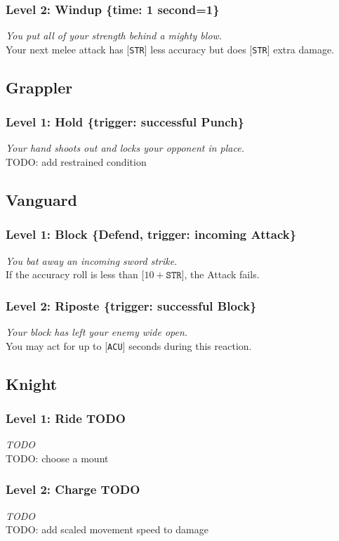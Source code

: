 \documentclass[12pt]{article}
\newcommand{\STR}{\texttt{STR}}
\newcommand{\ACU}{\texttt{ACU}}
\newcommand{\TIME}[1]{\{time: #1 second\if1=#1{}\else{s}\fi\}}
\newcommand{\TRIG}[1]{\{trigger: #1\}}
\newcommand{\Defend}{\{Defend, trigger: incoming Attack\}}
\newcommand{\Class}[1]{\pagebreak\subsection{#1}\label{#1}}
\newcommand{\Skill}[5]{\subsubsection{Level #1: #2 #3}\textit{#4}\\[1mm]#5}
\begin{document}
\Skill{2}{Windup}{\TIME{1}}
{You put all of your strength behind a mighty blow.}
{Your next melee attack has [\STR] less accuracy but does [\STR] extra damage.}

\Class{Grappler}

\Skill{1}{Hold}{\TRIG{successful Punch}}
{Your hand shoots out and locks your opponent in place.}
{TODO: add restrained condition}

\Class{Vanguard}

\Skill{1}{Block}{\Defend}
{You bat away an incoming sword strike.}
{If the accuracy roll is less than [$10 + \STR$], the Attack fails.}

\Skill{2}{Riposte}{\TRIG{successful Block}}
{Your block has left your enemy wide open.}
{You may act for up to [\ACU] seconds during this reaction.}

\Class{Knight}

\Skill{1}{Ride}{TODO}
{TODO}
{TODO: choose a mount}

\Skill{2}{Charge}{TODO}
{TODO}
{TODO: add scaled movement speed to damage}
\end{document}
